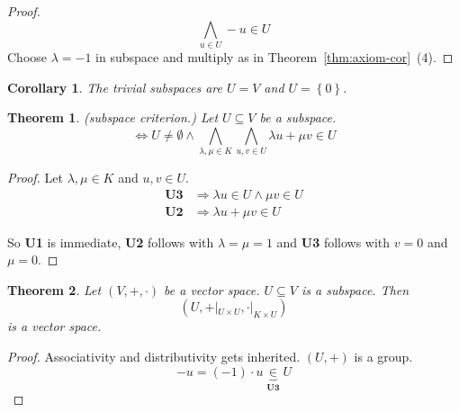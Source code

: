 \documentclass[a4paper,landscape,twocolumn]{article}
\newcommand\set[1]{\left\{#1\right\}}
\newtheorem{theorem}{Theorem}
\newtheorem{cor}{Corollary}
\begin{document}
\begin{proof}
  \[ \bigwedge_{u \in U} -u \in U \]
  Choose $\lambda = -1$ in subspace and multiply as in Theorem~\ref{thm:axiom-cor}~(4).
\end{proof}

\begin{cor}
  The \emph{trivial} subspaces are $U = V$ and $U = \set{0}$.
\end{cor}

\begin{theorem}
  \label{satz-3-3}
  (subspace criterion.)
  Let $U \subseteq V$ be a subspace.
  \[ \Leftrightarrow U \neq \emptyset \land \bigwedge_{\lambda,\mu \in K} \bigwedge_{u,v \in U} \lambda u + \mu v \in U \]
\end{theorem}

\begin{proof}
  Let $\lambda, \mu \in K$ and $u,v \in U$.
  \begin{align*}
    \textbf{U3} &\Rightarrow \lambda u \in U \land \mu v \in U \\
    \textbf{U2} &\Rightarrow \lambda u + \mu v \in U
  \end{align*}

  So \textbf{U1} is immediate, \textbf{U2} follows with $\lambda = \mu = 1$ and \textbf{U3} follows with $v = 0$ and $\mu = 0$.
\end{proof}

\begin{theorem}
  Let $(V, +, \cdot)$ be a vector space. $U \subseteq V$ is a subspace.
  Then
  \[ \left(U, +|_{U \times U}, \cdot |_{K \times U}\right) \]
  is a vector space.
\end{theorem}

\begin{proof}
  Associativity and distributivity gets inherited.
  $(U, +)$ is a group.
  \[ -u = (-1) \cdot u \underbrace{\in}_{\textbf{U3}} U \]
\end{proof}
\end{document}
